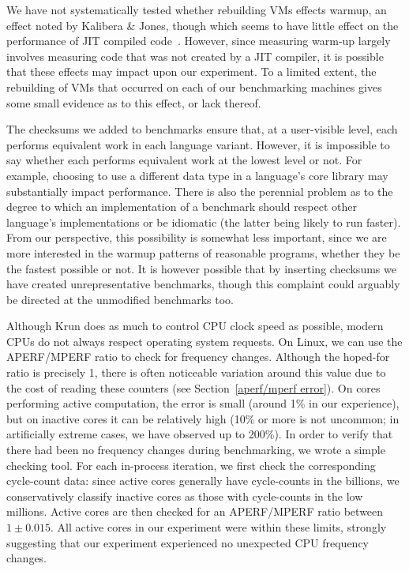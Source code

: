 \documentclass[preprint,numbers,10pt]{sigplanconf}
\newcommand{\kalibera}{Kalibera \& Jones\xspace}
\newcommand{\krun}{Krun\xspace}
\begin{document}
We have not systematically tested whether rebuilding VMs effects warmup, an
effect noted by \kalibera, though which seems to have little effect on
the performance of JIT compiled code~\cite{barrett15approaches}. However, since measuring warm-up largely
involves measuring code that was not created by a JIT compiler, it is possible
that these effects may impact upon our experiment. To a limited extent, the
rebuilding of VMs that occurred on each of our benchmarking machines gives
some small evidence as to this effect, or lack thereof.

The checksums we added to benchmarks ensure that, at a user-visible level, each
performs equivalent work in each language variant. However, it is impossible to
say whether each performs equivalent work at the lowest level or not. For
example, choosing to use a different data type in a language's core library may
substantially impact performance. There is also the perennial problem as to the
degree to which an implementation of a benchmark should respect other
language's implementations or be idiomatic (the latter being likely to
run faster). From our perspective, this possibility is somewhat less important,
since we are more interested in the warmup patterns of reasonable programs,
whether they be the fastest possible or not. It is however possible that by
inserting checksums we have created unrepresentative benchmarks, though
this complaint could arguably be directed at the unmodified benchmarks too.

Although \krun does as much to control CPU clock speed as possible, modern CPUs
do not always respect operating system requests. On Linux, we can use the
APERF/MPERF ratio to check for frequency changes. Although the hoped-for
ratio is precisely 1, there is often noticeable variation around this value due to the
cost of reading these counters (see Section~\ref{aperf/mperf error}). On cores
performing active computation, the error is small (around 1\% in our
experience), but on inactive cores it can be relatively high (10\% or more is
not uncommon; in artificially extreme cases, we have observed up to 200\%).
In order to verify that there had been no frequency changes during benchmarking,
we wrote a simple checking tool. For each in-process iteration, we first check
the corresponding cycle-count data: since active cores generally have
cycle-counts in the billions, we conservatively classify inactive
cores as those with cycle-counts in the low millions. Active cores are then
checked for an APERF/MPERF ratio between $1 \pm 0.015$. All active cores in our
experiment were within these limits, strongly suggesting that our experiment
experienced no unexpected CPU frequency changes.
\end{document}
